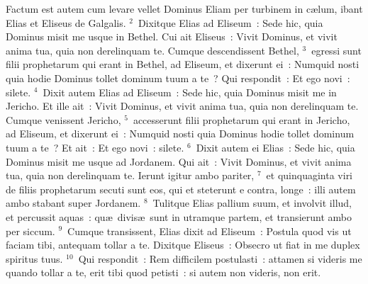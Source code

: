 \lettrine[lines=10,image=true,loversize=0.05,lraise=-0.03]{F}{}actum est autem cum levare vellet Dominus Eliam per turbinem in c\ae lum, ibant Elias et Eliseus de Galgalis.
${}^{2}$~Dixitque Elias ad Eliseum~: Sede hic, quia Dominus misit me usque in Bethel. Cui ait Eliseus~: Vivit Dominus, et vivit anima tua, quia non derelinquam te. Cumque descendissent Bethel,
${}^{3}$~egressi sunt filii prophetarum qui erant in Bethel, ad Eliseum, et dixerunt ei~: Numquid nosti quia hodie Dominus tollet dominum tuum a te~? Qui respondit~: Et ego novi~: silete.
${}^{4}$~Dixit autem Elias ad Eliseum~: Sede hic, quia Dominus misit me in Jericho. Et ille ait~: Vivit Dominus, et vivit anima tua, quia non derelinquam te. Cumque venissent Jericho,
${}^{5}$~accesserunt filii prophetarum qui erant in Jericho, ad Eliseum, et dixerunt ei~: Numquid nosti quia Dominus hodie tollet dominum tuum a te~? Et ait~: Et ego novi~: silete.
${}^{6}$~Dixit autem ei Elias~: Sede hic, quia Dominus misit me usque ad Jordanem. Qui ait~: Vivit Dominus, et vivit anima tua, quia non derelinquam te. Ierunt igitur ambo pariter,
${}^{7}$~et quinquaginta viri de filiis prophetarum secuti sunt eos, qui et steterunt e contra, longe~: illi autem ambo stabant super Jordanem.
${}^{8}$~Tulitque Elias pallium suum, et involvit illud, et percussit aquas~: qu\ae\ divis\ae\ sunt in utramque partem, et transierunt ambo per siccum.
${}^{9}$~Cumque transissent, Elias dixit ad Eliseum~: Postula quod vis ut faciam tibi, antequam tollar a te. Dixitque Eliseus~: Obsecro ut fiat in me duplex spiritus tuus.
${}^{10}$~Qui respondit~: Rem difficilem postulasti~: attamen si videris me quando tollar a te, erit tibi quod petisti~: si autem non videris, non erit.


